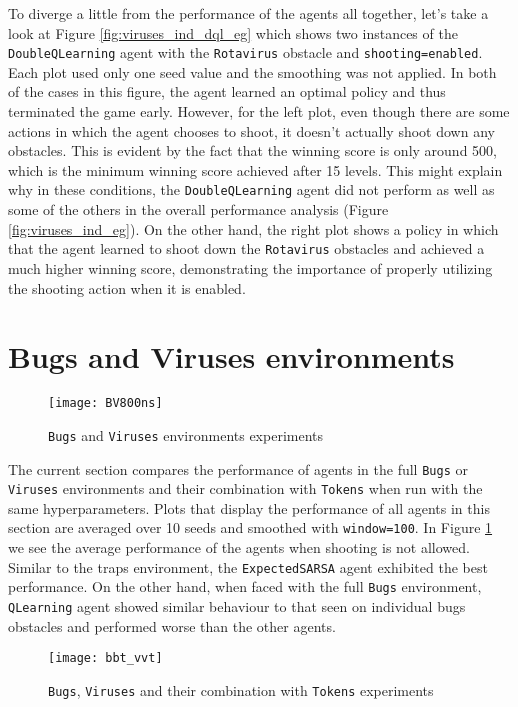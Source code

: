 To diverge a little from the performance of the agents all together, let's take a look at Figure \ref{fig:viruses_ind_dql_eg} which shows two instances of the \texttt{DoubleQLearning} agent with the \texttt{Rotavirus} obstacle and \texttt{shooting=enabled}. Each plot used only one seed value and the smoothing was not applied. In both of the cases in this figure, the agent learned an optimal policy and thus terminated the game early. However, for the left plot, even though there are some actions in which the agent chooses to shoot, it doesn't actually shoot down any obstacles. This is evident by the fact that the winning score is only around 500, which is the minimum winning score achieved after 15 levels.  This might explain why in these conditions, the \texttt{DoubleQLearning} agent did not perform as well as some of the others in the overall performance analysis (Figure \ref{fig:viruses_ind_eg}). On the other hand, the right plot shows a policy in which that the agent learned to shoot down the \texttt{Rotavirus} obstacles and achieved a much higher winning score, demonstrating the importance of properly utilizing the shooting action when it is enabled.

\section{Bugs and Viruses environments}
\begin{figure}[h]
    \centering
    \texttt{[image: BV800ns]}
    \caption{\texttt{Bugs} and \texttt{Viruses} environments experiments}
    \label{fig:bv800ns_eg}
\end{figure}

The current section compares the performance of agents in the full \texttt{Bugs} or \texttt{Viruses} environments and their combination with \texttt{Tokens} when run with the same hyperparameters. Plots that display the performance of all agents in this section are averaged over 10 seeds and smoothed with \texttt{window=100}. In Figure \ref{fig:bv800ns_eg} we see the average performance of the agents when shooting is not allowed. Similar to the traps environment, the \texttt{ExpectedSARSA} agent exhibited the best performance. On the other hand, when faced with the full \texttt{Bugs} environment, \texttt{QLearning} agent showed similar behaviour to that seen on individual bugs obstacles and performed worse than the other agents.

\begin{figure}[h]
    \centering
    \texttt{[image: bbt\_vvt]}
    \caption{\texttt{Bugs}, \texttt{Viruses} and their combination with \texttt{Tokens} experiments}
    \label{fig:bbt_vvt_eg}
\end{figure}

